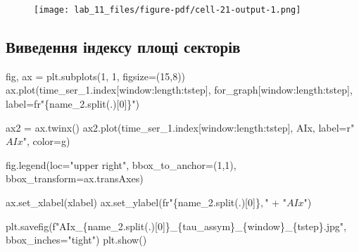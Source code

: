 \documentclass[
  letterpaper,
]{report}
\newenvironment{Shaded}{\begin{snugshade}}{\end{snugshade}}
\newcommand{\DecValTok}[1]{\textcolor[rgb]{0.68,0.00,0.00}{#1}}
\newcommand{\NormalTok}[1]{\textcolor[rgb]{0.00,0.23,0.31}{#1}}
\newcommand{\OperatorTok}[1]{\textcolor[rgb]{0.37,0.37,0.37}{#1}}
\newcommand{\SpecialCharTok}[1]{\textcolor[rgb]{0.37,0.37,0.37}{#1}}
\newcommand{\SpecialStringTok}[1]{\textcolor[rgb]{0.13,0.47,0.30}{#1}}
\newcommand{\StringTok}[1]{\textcolor[rgb]{0.13,0.47,0.30}{#1}}
\newcommand{\VerbatimStringTok}[1]{\textcolor[rgb]{0.13,0.47,0.30}{#1}}
\begin{document}
\begin{figure}[H]

{\centering \texttt{[image: lab\_11\_files/figure-pdf/cell-21-output-1.png]}

}

\end{figure}

\hypertarget{ux432ux438ux432ux435ux434ux435ux43dux43dux44f-ux456ux43dux434ux435ux43aux441ux443-ux43fux43bux43eux449ux456-ux441ux435ux43aux442ux43eux440ux456ux432}{%
\subsection{Виведення індексу площі
секторів}\label{ux432ux438ux432ux435ux434ux435ux43dux43dux44f-ux456ux43dux434ux435ux43aux441ux443-ux43fux43bux43eux449ux456-ux441ux435ux43aux442ux43eux440ux456ux432}}

\begin{Shaded}
\begin{Highlighting}[]
\NormalTok{fig, ax }\OperatorTok{=}\NormalTok{ plt.subplots(}\DecValTok{1}\NormalTok{, }\DecValTok{1}\NormalTok{, figsize}\OperatorTok{=}\NormalTok{(}\DecValTok{15}\NormalTok{,}\DecValTok{8}\NormalTok{))}
\NormalTok{ax.plot(time\_ser\_1.index[window:length:tstep], for\_graph[window:length:tstep], label}\OperatorTok{=}\VerbatimStringTok{fr"}\SpecialCharTok{\{}\NormalTok{name\_2}\SpecialCharTok{.}\NormalTok{split(}\StringTok{\textquotesingle{}.\textquotesingle{}}\NormalTok{)[}\DecValTok{0}\NormalTok{]}\SpecialCharTok{\}}\VerbatimStringTok{"}\NormalTok{)}

\NormalTok{ax2 }\OperatorTok{=}\NormalTok{ ax.twinx()}
\NormalTok{ax2.plot(time\_ser\_1.index[window:length:tstep], AIx, label}\OperatorTok{=}\VerbatimStringTok{r"$ AIx $"}\NormalTok{, color}\OperatorTok{=}\StringTok{\textquotesingle{}g\textquotesingle{}}\NormalTok{)}

\NormalTok{fig.legend(loc}\OperatorTok{=}\StringTok{"upper right"}\NormalTok{, bbox\_to\_anchor}\OperatorTok{=}\NormalTok{(}\DecValTok{1}\NormalTok{,}\DecValTok{1}\NormalTok{), bbox\_transform}\OperatorTok{=}\NormalTok{ax.transAxes)}

\NormalTok{ax.set\_xlabel(xlabel)}
\NormalTok{ax.set\_ylabel(}\VerbatimStringTok{fr"}\SpecialCharTok{\{}\NormalTok{name\_2}\SpecialCharTok{.}\NormalTok{split(}\StringTok{\textquotesingle{}.\textquotesingle{}}\NormalTok{)[}\DecValTok{0}\NormalTok{]}\SpecialCharTok{\}}\VerbatimStringTok{$,$"} \OperatorTok{+} \StringTok{"$AIx$"}\NormalTok{)}

\NormalTok{plt.savefig(}\SpecialStringTok{f"AIx\_}\SpecialCharTok{\{}\NormalTok{name\_2}\SpecialCharTok{.}\NormalTok{split(}\StringTok{\textquotesingle{}.\textquotesingle{}}\NormalTok{)[}\DecValTok{0}\NormalTok{]}\SpecialCharTok{\}}\SpecialStringTok{\_}\SpecialCharTok{\{}\NormalTok{tau\_assym}\SpecialCharTok{\}}\SpecialStringTok{\_}\SpecialCharTok{\{}\NormalTok{window}\SpecialCharTok{\}}\SpecialStringTok{\_}\SpecialCharTok{\{}\NormalTok{tstep}\SpecialCharTok{\}}\SpecialStringTok{.jpg"}\NormalTok{, bbox\_inches}\OperatorTok{=}\StringTok{"tight"}\NormalTok{)}
\NormalTok{plt.show()}
\end{Highlighting}
\end{Shaded}
\end{document}
